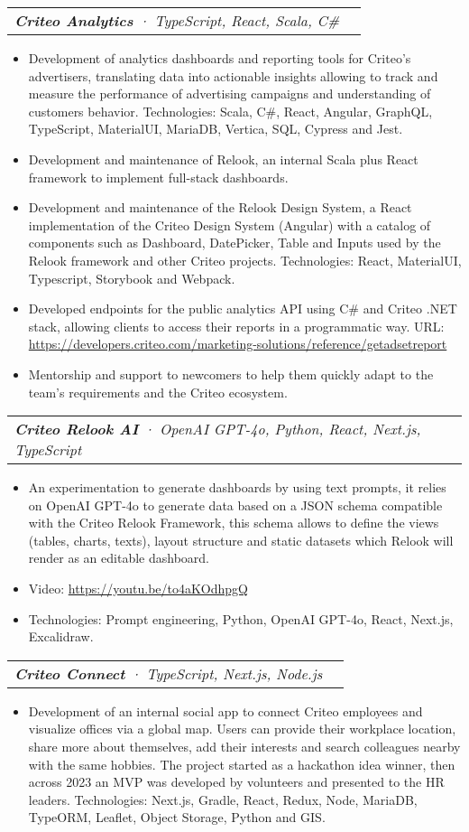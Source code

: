 \documentclass[letterpaper,11pt]{article}
\makeatletter
\newcommand{\resumeItem}[1]{
  \item\small{
    {#1 \vspace{-2pt}}
  }
}
\newcommand{\resumeSubSubheading}[2]{
    \vspace{-2pt}\item
    \begin{tabular*}{0.97\textwidth}{l@{\extracolsep{\fill}}r}
      \textit{\small#1} & \textit{\small #2} \\
    \end{tabular*}\vspace{-7pt}
}
\newcommand{\resumeItemListStart}{\begin{itemize}}
\newcommand{\resumeItemListEnd}{\end{itemize}\vspace{-5pt}}
\makeatother
\begin{document}
    \resumeSubSubheading{\textbf{Criteo Analytics} · TypeScript, React, Scala, C\# }{}
      \resumeItemListStart
        \resumeItem{Development of analytics dashboards and reporting tools for Criteo's advertisers, translating data into actionable insights allowing to track and measure the performance of advertising campaigns and understanding of customers behavior. Technologies: Scala, C\#, React, Angular, GraphQL, TypeScript, MaterialUI, MariaDB, Vertica, SQL, Cypress and Jest.}
        \resumeItem{Development and maintenance of Relook, an internal Scala plus React framework to implement full-stack dashboards.}
        \resumeItem{Development and maintenance of the Relook Design System, a React implementation of the Criteo Design System (Angular) with a catalog of components such as Dashboard, DatePicker, Table and Inputs used by the Relook framework and other Criteo projects. Technologies: React, MaterialUI, Typescript, Storybook and Webpack.}
        \resumeItem{Developed endpoints for the public analytics API using C\# and Criteo .NET stack, allowing clients to access their reports in a programmatic way. URL: {\href{https://developers.criteo.com/marketing-solutions/reference/getadsetreport}{\color{blue}https://developers.criteo.com/marketing-solutions/reference/getadsetreport}}
        }
        \resumeItem{Mentorship and support to newcomers to help them quickly adapt to the team's requirements and the Criteo ecosystem.}
        \resumeItemListEnd

    \resumeSubSubheading{\textbf{Criteo Relook AI} · OpenAI GPT-4o, Python, React, Next.js, TypeScript }{}
      \resumeItemListStart
        \resumeItem{An experimentation to generate dashboards by using text prompts, it relies on OpenAI GPT-4o to generate data based on a JSON schema compatible with the Criteo Relook Framework, this schema allows to define the views (tables, charts, texts), layout structure and static datasets which Relook will render as an editable dashboard.}
        \resumeItem{Video: {\href{https://youtu.be/to4aKOdhpgQ}{\color{blue}https://youtu.be/to4aKOdhpgQ}}}
        \resumeItem{Technologies: Prompt engineering, Python, OpenAI GPT-4o, React, Next.js, Excalidraw.}
        \resumeItemListEnd

    \resumeSubSubheading{\textbf{Criteo Connect} · TypeScript, Next.js, Node.js }{}
      \resumeItemListStart
        \resumeItem{Development of an internal social app to connect Criteo employees and visualize offices via a global map. Users can provide their workplace location, share more about themselves, add their interests and search colleagues nearby with the same hobbies. The project started as a hackathon idea winner, then across 2023 an MVP was developed by volunteers and presented to the HR leaders. Technologies: Next.js, Gradle, React, Redux, Node, MariaDB, TypeORM, Leaflet, Object Storage, Python and GIS.}
        \resumeItemListEnd
      
\end{document}
